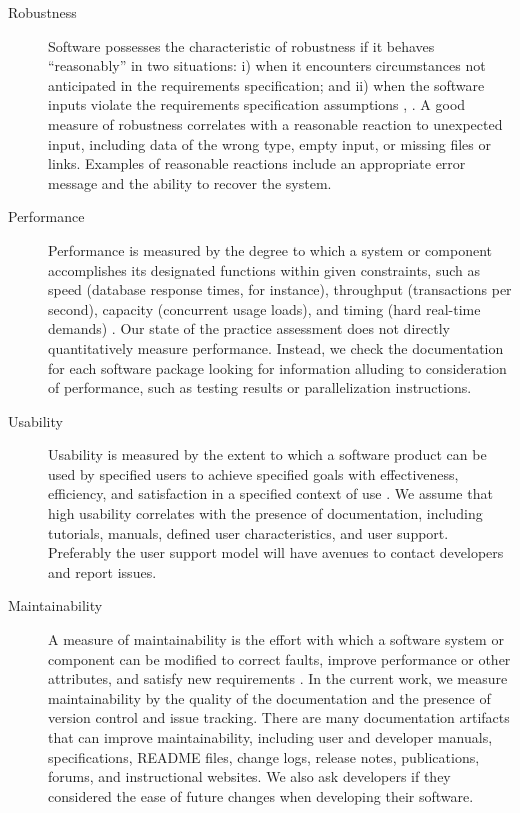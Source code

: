 \documentclass[final, 3p, times, authoryear]{elsarticle}
\begin{document}
\begin{description}
	\item[Robustness] Software possesses the characteristic of robustness if it
	behaves ``reasonably'' in two situations: i) when it encounters
	circumstances not anticipated in the requirements specification; and ii)
	when the software inputs violate the requirements specification assumptions
	\citep{boehm2007software}, \citep[p.\ 19]{GhezziEtAl2003}. A good measure of
	robustness correlates with a reasonable reaction to unexpected input,
	including data of the wrong type, empty input, or missing files or links.
	Examples of reasonable reactions include an appropriate error message and the
	ability to recover the system.

	\item[Performance] Performance is measured by the degree to which a system
	or component accomplishes its designated functions within given constraints,
	such as speed (database response times, for instance), throughput
	(transactions per second), capacity (concurrent usage loads), and timing
	(hard real-time demands) \citep{IEEEStdGlossarySET1990, wiegers2003softreq}.
	Our state of the practice assessment does not directly quantitatively
	measure performance. Instead, we check the documentation for each software
	package looking for information alluding to consideration of performance,
	such as testing results or parallelization instructions. 

	\item[Usability] Usability is measured by the extent to which a software
	product can be used by specified users to achieve specified goals with
	effectiveness, efficiency, and satisfaction in a specified context of use
	\citep{nielsonusability}. We assume that high usability correlates with
	the presence of documentation, including tutorials, manuals, defined
	user characteristics, and user support. Preferably the user support model
	will have avenues to contact developers and report issues.

	\item[Maintainability] A measure of maintainability is the effort with which
	a software system or component can be modified to correct faults, improve
	performance or other attributes, and satisfy new requirements
	\citep{IEEEStdGlossarySET1990, boehm2007software}. In the current work, we
	measure maintainability by the quality of the documentation and the presence
	of version control and issue tracking. There are many documentation
	artifacts that can improve maintainability, including user and developer
	manuals, specifications, README files, change logs, release notes,
	publications, forums, and instructional websites. We also ask developers
	if they considered the ease of future changes when developing their
	software. 


\end{description}
\end{document}
